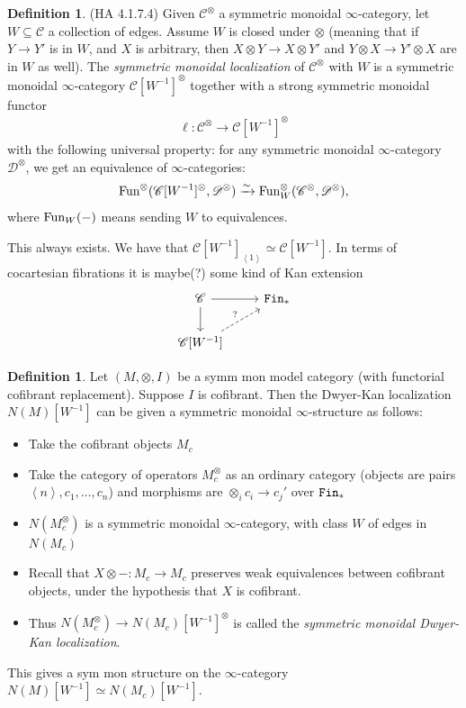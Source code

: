 \documentclass[12pt]{amsart}
\theoremstyle{definition}
\newtheorem{definition}[theorem]{Definition}
\begin{document}
\begin{definition} (HA 4.1.7.4) Given $\mathscr{C}^\otimes$ a symmetric monoidal $\infty$-category, let $W \subseteq \mathscr{C}$ a collection of edges. Assume $W$ is closed under $\otimes$ (meaning that if $Y \to Y'$ is in $W$, and $X$ is arbitrary, then $X \otimes Y \to X \otimes Y'$ and $Y \otimes X \to Y' \otimes X$ are in $W$ as well). The \textit{symmetric monoidal localization} of $\mathscr{C}^\otimes$ with $W$ is a symmetric monoidal $\infty$-category $\mathscr{C}[W^{-1}]^\otimes$ together with a strong symmetric monoidal functor
\begin{align*}
    \ell:\mathscr{C}^\otimes \to \mathscr{C}[W^{-1}]^\otimes
\end{align*}
with the following universal property: for any symmetric monoidal $\infty$-category $\mathscr{D}^\otimes$, we get an equivalence of $\infty$-categories:
\begin{align*}
    \text{Fun}^\otimes(\mathscr{C}[W^{-1}]^\otimes, \mathscr{D}^\otimes) \xrightarrow{\sim} \text{Fun}^\otimes_W(\mathscr{C}^\otimes,\mathscr{D}^\otimes),
\end{align*}
where $\text{Fun}_W(-)$ means sending $W$ to equivalences.
\end{definition}

This always exists. We have that $\mathscr{C}[W^{-1}]_{\left\langle 1 \right\rangle} \simeq \mathscr{C}[W^{-1}]$. In terms of cocartesian fibrations it is maybe(?) some kind of Kan extension
\[ \begin{tikzcd}
    \mathscr{C}\dar\rar & \Fin_\ast\\
    \mathscr{C}[W^{-1}]\ar[ur,dashed,"?"] & 
\end{tikzcd} \]

\begin{definition} Let $(M,\otimes,I)$ be a symm mon model category (with functorial cofibrant replacement). Suppose $I$ is cofibrant. Then the Dwyer-Kan localization $N(M)[W^{-1}]$ can be given a symmetric monoidal $\infty$-structure as follows:
\begin{itemize}
    \item Take the cofibrant objects $M_c$
    \item Take the category of operators $M_c^\otimes$ as an ordinary category (objects are pairs $\left\langle n \right\rangle, c_1, \ldots, c_n$) and morphisms are $\otimes_i c_i \to c_j'$ over $\texttt{Fin}_\ast$
    \item $N(M_c^\otimes)$ is a symmetric monoidal $\infty$-category, with class $W$ of edges in $N(M_c)$
    \item Recall that $X \otimes -: M_c \to M_c$ preserves weak equivalences between cofibrant objects, under the hypothesis that $X$ is cofibrant.
    \item Thus $N(M_c^\otimes) \to N(M_c)[W^{-1}]^\otimes$ is called the \textit{symmetric monoidal Dwyer-Kan localization}.
\end{itemize}
This gives a sym mon structure on the $\infty$-category $N(M)[W^{-1}]\simeq N(M_c)[W^{-1}]$.
\end{definition}
\end{document}
